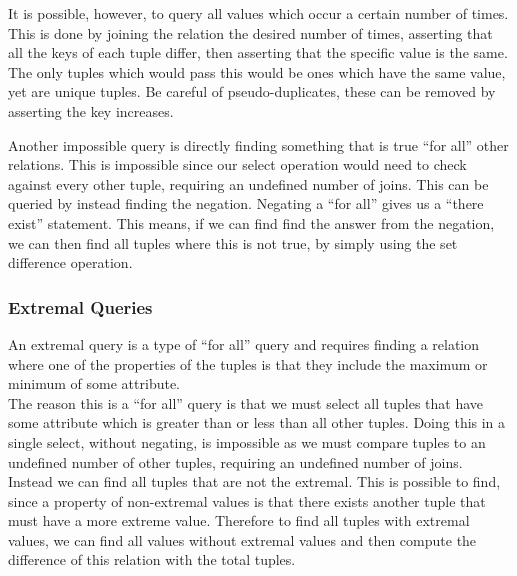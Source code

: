 \documentclass{report}
\begin{document}
\begin{note}
    It is possible, however, to query all values which occur a certain number of times. This is done by joining the relation the desired number of times, asserting that all the keys of each tuple differ, then asserting that the specific value is the same. The only tuples which would pass this would be ones which have the same value, yet are unique tuples. Be careful of pseudo-duplicates, these can be removed by asserting the key increases.
\end{note}
\vspace{.2cm}
Another impossible query is directly finding something that is true ``for all'' other relations. This is impossible since our select operation would need to check against every other tuple, requiring an undefined number of joins. This can be queried by instead finding the negation. Negating a ``for all'' gives us a ``there exist'' statement. This means, if we can find find the answer from the negation, we can then find all tuples where this is not true, by simply using the set difference operation.


\subsubsection{Extremal Queries}

An extremal query is a type of ``for all'' query and requires finding a relation where one of the properties of the tuples is that they include the maximum or minimum of some attribute. \\
The reason this is a ``for all'' query is that we must select all tuples that have some attribute which is greater than or less than all other tuples. Doing this in a single select, without negating, is impossible as we must compare tuples to an undefined number of other tuples, requiring an undefined number of joins. \\
Instead we can find all tuples that are not the extremal. This is possible to find, since a property of non-extremal values is that there exists another tuple that must have a more extreme value. Therefore to find all tuples with extremal values, we can find all values without extremal values and then compute the difference of this relation with the total tuples. 

\end{document}
